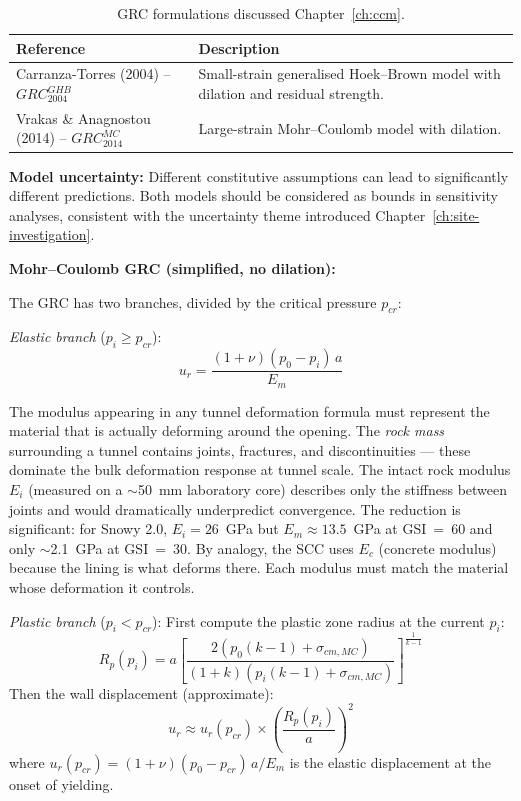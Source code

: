 \begin{table}[h!]
\centering
\begin{tabularx}{\textwidth}{l X}
\toprule
\textbf{Reference} & \textbf{Description} \\
\midrule
Carranza-Torres (2004) -- $GRC_{2004}^{GHB}$ & Small-strain generalised Hoek--Brown model with dilation and residual strength. \\
Vrakas \& Anagnostou (2014) -- $GRC_{2014}^{MC}$ & Large-strain Mohr--Coulomb model with dilation. \\
\bottomrule
\end{tabularx}
\caption{GRC formulations discussed Chapter~\ref{ch:ccm}.}
\end{table}

\textbf{Model uncertainty:} Different constitutive assumptions can lead to significantly different predictions. Both models should be considered as bounds in sensitivity analyses, consistent with the uncertainty theme introduced Chapter~\ref{ch:site-investigation}.

\textbf{Mohr--Coulomb GRC (simplified, no dilation):}

The GRC has two branches, divided by the critical pressure $p_{cr}$:

\textit{Elastic branch} ($p_i \geq p_{cr}$):
\[
u_r = \frac{(1+\nu)(p_0 - p_i)\,a}{E_m}
\]

\begin{notebox}
The modulus appearing in any tunnel deformation formula must represent the material that is actually deforming around the opening. The \textit{rock mass} surrounding a tunnel contains joints, fractures, and discontinuities --- these dominate the bulk deformation response at tunnel scale. The intact rock modulus $E_i$ (measured on a $\sim$50~mm laboratory core) describes only the stiffness between joints and would dramatically underpredict convergence. The reduction is significant: for Snowy 2.0, $E_i = 26$~GPa but $E_m \approx 13.5$~GPa at GSI~=~60 and only $\sim$2.1~GPa at GSI~=~30. By analogy, the SCC uses $E_c$ (concrete modulus) because the lining is what deforms there. Each modulus must match the material whose deformation it controls.
\end{notebox}

\textit{Plastic branch} ($p_i < p_{cr}$): First compute the plastic zone radius at the current $p_i$:
\[
R_p(p_i) = a \left[ \frac{2\left(p_0(k-1)+\sigma_{cm,MC}\right)}{(1+k)\left(p_i(k-1)+\sigma_{cm,MC}\right)} \right]^{\frac{1}{k-1}}
\]
Then the wall displacement (approximate):
\[
u_r \approx u_r(p_{cr}) \times \left(\frac{R_p(p_i)}{a}\right)^2
\]
where $u_r(p_{cr}) = (1+\nu)(p_0-p_{cr})\,a/E_m$ is the elastic displacement at the onset of yielding.

